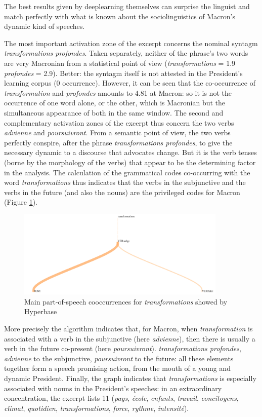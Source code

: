 The best results given by deeplearning themselves can surprise the linguist and match perfectly with what is known about the sociolinguistics of Macron's dynamic kind of speeches.

The most important activation zone of the excerpt concerns the nominal syntagm \textit{transformations profondes}. Taken separately, neither of the phrase's two words are very Macronian from a statistical point of view (\textit{transformations} = 1.9 \textit{profondes} = 2.9). Better: the syntagm itself is not attested in the President's learning corpus (0 occurrence). However, it can be seen that the co-occurrence of \textit{transformation} and \textit{profondes} amounts to 4.81 at Macron: so it is not the occurrence of one word alone, or the other, which is Macronian but the simultaneous appearance of both in the same window. The second and complementary activation zones of the excerpt thus concern the two verbs \textit{advienne} and \textit{poursuivront}. From a semantic point of view, the two verbs perfectly conspire, after the phrase \textit{transformations profondes}, to give the necessary dynamic to a discourse that advocates change. But it is the verb tenses (borne by the morphology of the verbs) that appear to be the determining factor in the analysis. The calculation of the grammatical codes co-occurring with the word \textit{transformations} thus indicates that the verbs in the subjunctive and the verbs in the future (and also the nouns) are the privileged codes for Macron (Figure \ref{macron}). 

\begin{figure}[h]
\begin{center}
\includegraphics[width=10cm]{img/macron_cooc.png}
\caption{Main part-of-speech cooccurrences for \textit{transformations} showed by Hyperbase}
\label{macron}
\end{center}
\end{figure}


More precisely the algorithm indicates that, for Macron, when \textit{transformation} is associated with a verb in the subjunctive (here \textit{advienne}), then there is usually a verb in the future co-present (here \textit{poursuivront}). \textit{transformations profondes}, \textit{advienne} to the subjunctive, \textit{poursuivront} to the future: all these elements together form a speech promising action, from the mouth of a young and dynamic President. Finally, the graph indicates that \textit{transformations} is especially associated with nouns in the President's speeches: in an extraordinary concentration, the excerpt lists 11 (\textit{pays}, \textit{école}, \textit{enfants}, \textit{travail}, \textit{concitoyens}, \textit{climat}, \textit{quotidien}, \textit{transformations}, \textit{force}, \textit{rythme}, \textit{intensité}).

